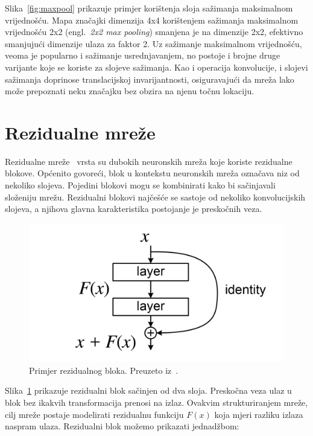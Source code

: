 \documentclass[times, utf8, zavrsni, numeric]{fer}
\begin{document}
Slika~\ref{fig:maxpool} prikazuje primjer korištenja sloja sažimanja maksimalnom vrijednošću.
Mapa značajki dimenzija 4x4 korištenjem sažimanja maksimalnom vrijednošću 2x2 (engl.\ \textit{2x2 max pooling}) smanjena je na dimenzije 2x2, efektivno smanjujući dimenzije ulaza za faktor 2.
Uz sažimanje maksimalnom vrijednošću, veoma je popularno i sažimanje usrednjavanjem, no postoje i brojne druge varijante koje se koriste za slojeve sažimanja.
Kao i operacija konvolucije, i slojevi sažimanja doprinose translacijskoj invarijantnosti, osiguravajući da mreža lako može prepoznati neku značajku bez obzira na njenu točnu lokaciju.

\section{Rezidualne mreže}

Rezidualne mreže~\cite{he2016deep} vrsta su dubokih neuronskih mreža koje koriste rezidualne blokove. Općenito govoreći, blok u kontekstu neuronskih mreža označava niz od nekoliko slojeva. 
Pojedini blokovi mogu se kombinirati kako bi sačinjavali složeniju mrežu. 
Rezidualni blokovi najčešće se sastoje od nekoliko konvolucijskih slojeva, a njihova glavna karakteristika postojanje je preskočnih veza.

\begin{figure}[htb]
    \centering
    \includegraphics{ResBlock.png}
    \caption{Primjer rezidualnog bloka. Preuzeto iz~\cite{he2016deep}.}
    \label{fig:resblock}
\end{figure}

Slika~\ref{fig:resblock} prikazuje rezidualni blok sačinjen od dva sloja. Preskočna veza ulaz u blok bez ikakvih transformacija prenosi na izlaz. 
Ovakvim strukturiranjem mreže, cilj mreže postaje modelirati rezidualnu funkciju $F(x)$ koja mjeri razliku izlaza naspram ulaza. Rezidualni blok možemo prikazati jednadžbom:
\end{document}
